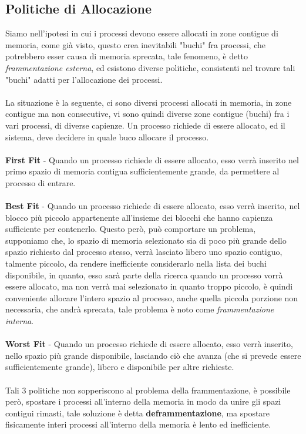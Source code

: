 \documentclass[12pt, letterpaper]{article}
\newcommand{\acc}{\\\hphantom{}\\}
\begin{document}
\subsection{Politiche di Allocazione}
Siamo nell'ipotesi in cui i processi devono essere allocati in zone contigue di memoria, come già visto, questo 
crea inevitabili "buchi" fra processi, che potrebbero esser causa di memoria sprecata, tale fenomeno, è detto \textit{frammentazione 
esterna}, ed esistono diverse politiche, consistenti nel trovare tali "buchi" adatti per l'allocazione dei processi.\acc
La situazione è la seguente, ci sono diversi processi allocati in memoria, in zone contigue ma non consecutive, vi sono quindi 
diverse zone contigue (buchi) fra i vari processi, di diverse capienze. Un processo richiede di essere allocato, 
ed il sistema, deve decidere in quale buco allocare il processo.\acc 
\textbf{First Fit }- Quando un processo richiede di essere allocato, esso verrà inserito nel primo spazio di memoria 
contigua sufficientemente grande, da permettere al processo di entrare.\acc
\textbf{Best Fit} -  Quando un processo richiede di essere allocato, esso verrà inserito, nel blocco 
più piccolo appartenente all'insieme dei blocchi che hanno capienza sufficiente per contenerlo. Questo però, può 
comportare un problema, supponiamo che, lo spazio di memoria selezionato sia di poco più 
grande dello spazio richiesto dal processo stesso, verrà lasciato libero uno spazio contiguo, talmente piccolo, 
da rendere inefficiente considerarlo nella lista dei buchi disponibile, in quanto, esso sarà parte della ricerca quando 
un processo vorrà essere allocato, ma non verrà mai selezionato in quanto troppo piccolo, è quindi conveniente 
allocare l'intero spazio al processo, anche quella piccola porzione non necessaria, che andrà sprecata, tale problema 
è noto come \textit{frammentazione interna}.\acc 
\textbf{Worst Fit} - Quando un processo richiede di essere allocato, esso verrà inserito, nello spazio 
più grande disponibile, lasciando ciò che avanza (che si prevede essere sufficientemente grande), libero e disponibile per altre richieste.\acc 
Tali 3 politiche non sopperiscono al problema della frammentazione, è possibile però, spostare i processi all'interno 
della memoria in modo da unire gli spazi contigui rimasti, tale soluzione è detta \textbf{deframmentazione}, ma spostare 
fisicamente interi processi all'interno della memoria è lento ed inefficiente.
\end{document}
